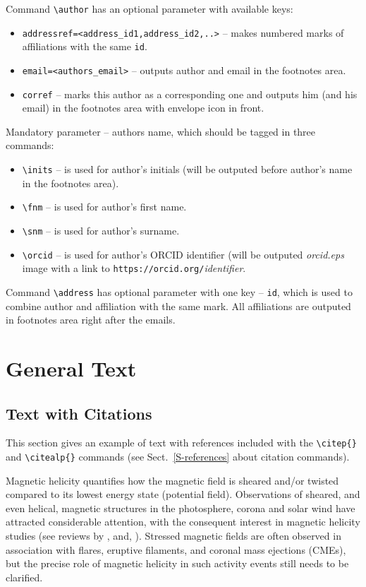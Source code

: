 \documentclass[namedreferences,hyperref,optionalrh]{spr-sola}
\begin{document}
Command \verb+\author+  has an optional parameter with available keys: 
\begin{itemize}
\item \verb+addressref=<address_id1,address_id2,..>+ -- makes numbered marks of affiliations with the same \texttt{id}.
\item \verb+email=<authors_email>+ -- outputs author and email in the footnotes area.
\item \verb+corref+ -- marks this author as a corresponding one and outputs him (and his email) in the footnotes area with envelope icon in front. 
\end{itemize}
Mandatory parameter -- authors name, which should be tagged in three commands:
\begin{itemize}
\item \verb+\inits+ -- is used for author's initials (will be outputed before author's name in the footnotes area).
\item \verb+\fnm+ -- is used for author's first name.
\item \verb+\snm+ -- is used for author's surname.
\item \verb+\orcid+ -- is used for author's ORCID identifier (will be outputed \textit{orcid.eps} image with a link to \verb+https://orcid.org/+\textit{identifier}.
\end{itemize}

Command \verb+\address+ has optional parameter  with one key -- \texttt{id}, which is used to combine author and affiliation with the same mark.
All affiliations are outputed in footnotes area right after the emails.
 
\section{General Text} %
      \label{S-general}      

\subsection{Text with Citations} %
  \label{S-text}
This section gives an example of text with references 
included with the \verb+\citep{}+ and \verb+\citealp{}+ commands
(see Sect.~\ref{S-references} about citation commands).

Magnetic helicity quantifies how the magnetic field is sheared
and/or twisted compared to its lowest energy state (potential
field). Observations of sheared, and even helical, magnetic
structures in the photosphere, corona and solar wind have
attracted considerable attention, with the consequent interest in
magnetic helicity studies (see reviews by \citealp{Brown99}, and,
\citealp{Berger03}). Stressed magnetic fields are often observed
in association with flares, eruptive filaments, and coronal mass
ejections (CMEs), but the precise role of magnetic helicity in
such activity events still needs to be clarified.
\end{document}
